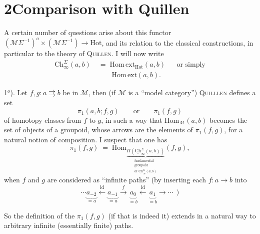 \documentclass[11pt]{article}
\newcommand{\printedpage}[1]{\marginpar{\footnotesize p.~#1}}
\newcommand{\msp}[1]{\marginpar{\footnotesize [#1]}}
\newcommand{\M}{\mathcal{M}}
\newcommand{\Hot}{\mathrm{Hot}}
\newcommand{\Ch}{\mathrm{Ch}}
\newcommand{\uCh}{\underline{\mathrm{Ch}}}
\newcommand{\Homext}{\mathrm{Hom\,ext}}
\begin{document}
\printedpage{9}

\msp{page 14}

\section*{2\quad Comparison with Quillen}

A certain number of questions arise about this functor $(\M\Sigma^{-1})^o \times (\M\Sigma^{-1}) \longrightarrow \Hot$, and its relation to the classical constructions, in particular to the theory of \textsc{Quillen}. I will now write
\[
\begin{aligned}
\Ch^{\Sigma}_{\infty}(a,b) \;&=\; \Homext_{\Hot}(a,b) && \text{or simply}\\
&\phantom{\;=\;} \Homext(a,b).
\end{aligned}
\]

1$^o$). Let $f,g : a \rightrightarrows b$ be in $\M$, then (if $\M$ is a ``model category'') \textsc{Quilllen} defines a set %
\[
\pi_1(a,b;f,g) \qquad \text{or} \qquad \pi_1(f,g)
\]
of homotopy classes from $f$ to $g$, in such a way that $\mathrm{Hom}_{\M}(a,b)$ becomes the set of objects of a groupoid, whose arrows are the elements of $\pi_1(f,g)$, for a natural notion of composition. I suspect that one has
\[
\pi_1(f,g) \;=\; \mathrm{Hom}_{\underbrace{\Pi(\uCh^{\Sigma}_{\infty}(a,b))}_{\substack{\text{fundamental}\\ \text{groupoid}\\ \text{of } \uCh^{\Sigma}_{\infty}(a,b)}}}(f,g), %
\]
when $f$ and $g$ are considered as ``infinite paths'' (by inserting each $f : a \longrightarrow b$ into
\[
\cdots \underbrace{a_{-2}}_{=a} \xleftarrow{\ \mathrm{id}\ } \underbrace{a_{-1}}_{=a} \xrightarrow{\ f\ } \underbrace{a_{0}}_{=b} \xleftarrow{\ \mathrm{id}\ } \underbrace{a_{1}}_{=b} \longrightarrow \cdots\ \ )
\]

\msp{page 15}

So the definition of the $\pi_1(f,g)$ (if that is indeed it) extends in a natural way to arbitrary infinite (essentially finite) paths.
\end{document}
